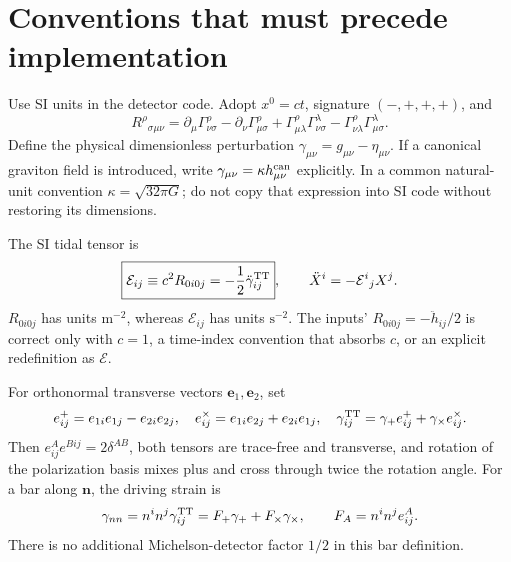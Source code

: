 \documentclass[a4paper,11pt]{article}
\newcommand{\calE}{\mathcal E}
\begin{document}
\section{Conventions that must precede implementation}
\label{sec:conv}

Use SI units in the detector code. Adopt $x^0=ct$, signature $(-,+,+,+)$, and
\begin{equation}
 R^\rho{}_{\sigma\mu\nu}=\partial_\mu\Gamma^\rho_{\nu\sigma}-\partial_\nu\Gamma^\rho_{\mu\sigma}
 +\Gamma^\rho_{\mu\lambda}\Gamma^\lambda_{\nu\sigma}
 -\Gamma^\rho_{\nu\lambda}\Gamma^\lambda_{\mu\sigma}.
\end{equation}
Define the physical dimensionless perturbation $\gamma_{\mu\nu}=g_{\mu\nu}-\eta_{\mu\nu}$. If a canonical graviton field is introduced, write $\gamma_{\mu\nu}=\kappa h^{\rm can}_{\mu\nu}$ explicitly. In a common natural-unit convention $\kappa=\sqrt{32\pi G}$; do not copy that expression into SI code without restoring its dimensions.

The SI tidal tensor is
\begin{equation}
 \boxed{\calE_{ij}\equiv c^2R_{0i0j}=-\frac12\ddot\gamma^{\rm TT}_{ij}},
 \qquad \ddot X^i=-\calE^i{}_jX^j .
 \label{eq:tidal}
\end{equation}
$R_{0i0j}$ has units $\mathrm{m}^{-2}$, whereas $\calE_{ij}$ has units $\mathrm{s}^{-2}$. The inputs' $R_{0i0j}=-\ddot h_{ij}/2$ is correct only with $c=1$, a time-index convention that absorbs $c$, or an explicit redefinition as $\calE$.

For orthonormal transverse vectors $\bm e_1,\bm e_2$, set
\begin{equation}
 e^+_{ij}=e_{1i}e_{1j}-e_{2i}e_{2j},\quad
 e^\times_{ij}=e_{1i}e_{2j}+e_{2i}e_{1j},\quad
 \gamma^{\rm TT}_{ij}=\gamma_+e^+_{ij}+\gamma_\times e^\times_{ij}.
\end{equation}
Then $e^A_{ij}e^{Bij}=2\delta^{AB}$, both tensors are trace-free and transverse, and rotation of the polarization basis mixes plus and cross through twice the rotation angle. For a bar along $\bm n$, the driving strain is
\begin{equation}
 \gamma_{nn}=n^in^j\gamma^{\rm TT}_{ij}=F_+\gamma_++F_\times\gamma_\times,
 \qquad F_A=n^in^je^A_{ij}.
\end{equation}
There is no additional Michelson-detector factor $1/2$ in this bar definition.
\end{document}
